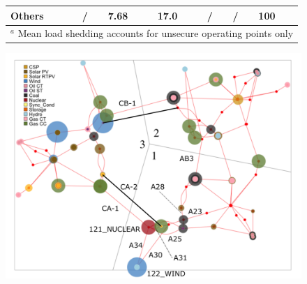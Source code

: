 {\begin{landscape}
\begin{figure}
\begin{minipage}{\linewidth}
\begin{minipage}[c]{0.58\linewidth}
\begin{tabular}{@{}lllllll@{}}
    Others & /         & 7.68   & 17.0  & /    & /    & 100  \\ \bottomrule
    \multicolumn{7}{l}{\(^a\) Mean load shedding accounts for unsecure operating points only} \\
    \end{tabular}
  \label{tab:critical_contingencies}
\end{minipage}
\hfill
\begin{minipage}[c]{0.42\linewidth}
  \strut\vspace*{-\baselineskip}\newline %
  \centering
  \includegraphics[width=0.8\linewidth]{Figs/RTS.png}
  \label{fig:RTS-copy}
\end{minipage}
\end{minipage}
\end{figure}



\end{landscape}}
